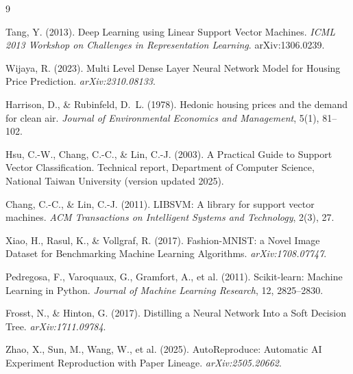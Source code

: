 \documentclass[10pt,twocolumn]{article}
\begin{document}

\begin{thebibliography}{9}

Tang, Y. (2013).
Deep Learning using Linear Support Vector Machines.
\textit{ICML 2013 Workshop on Challenges in Representation Learning}. arXiv:1306.0239.

Wijaya, R. (2023).
Multi Level Dense Layer Neural Network Model for Housing Price Prediction.
\textit{arXiv:2310.08133}.

Harrison, D., \& Rubinfeld, D.~L. (1978).
Hedonic housing prices and the demand for clean air.
\textit{Journal of Environmental Economics and Management}, 5(1), 81--102.

Hsu, C.-W., Chang, C.-C., \& Lin, C.-J. (2003).
A Practical Guide to Support Vector Classification. Technical report, Department of Computer
Science, National Taiwan University (version updated 2025).

Chang, C.-C., \& Lin, C.-J. (2011).
LIBSVM: A library for support vector machines.
\textit{ACM Transactions on Intelligent Systems and Technology}, 2(3), 27.

Xiao, H., Rasul, K., \& Vollgraf, R. (2017).
Fashion-MNIST: a Novel Image Dataset for Benchmarking Machine Learning Algorithms.
\textit{arXiv:1708.07747}.

Pedregosa, F., Varoquaux, G., Gramfort, A., et al. (2011).
Scikit-learn: Machine Learning in Python.
\textit{Journal of Machine Learning Research}, 12, 2825--2830.

Frosst, N., \& Hinton, G. (2017).
Distilling a Neural Network Into a Soft Decision Tree. \textit{arXiv:1711.09784}.

Zhao, X., Sun, M., Wang, W., et al. (2025).
AutoReproduce: Automatic AI Experiment Reproduction with Paper Lineage.
\textit{arXiv:2505.20662}.

\end{thebibliography}
\end{document}
